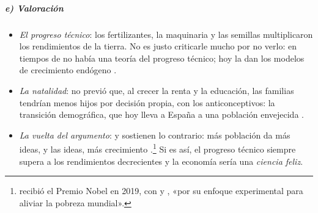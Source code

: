 \documentclass[11pt]{article}
\begin{document}
\subparagraph{e) Valoración}
\begin{itemize}
\item \emph{El progreso técnico}: los fertilizantes, la maquinaria y las semillas multiplicaron los rendimientos de la tierra. No es justo criticarle mucho por no verlo: en tiempos de  no había una teoría del progreso técnico; hoy la dan los modelos de crecimiento endógeno .
\item \emph{La natalidad}: no previó que, al crecer la renta y la educación, las familias tendrían menos hijos por decisión propia, con los anticonceptivos: la transición demográfica, que hoy lleva a España a una población envejecida .
\item \emph{La vuelta del argumento}: \textcite{Kremer1993} y \textcite{Simon1981Ultimate} sostienen lo contrario: más población da más ideas, y las ideas, más crecimiento .\footnote{ recibió el Premio Nobel en 2019, con  y , «por su enfoque experimental para aliviar la pobreza mundial»\nocite{NobelPrize2019}.} Si es así, el progreso técnico siempre supera a los rendimientos decrecientes y la economía sería una \emph{ciencia feliz}.
\end{itemize}
\end{document}
